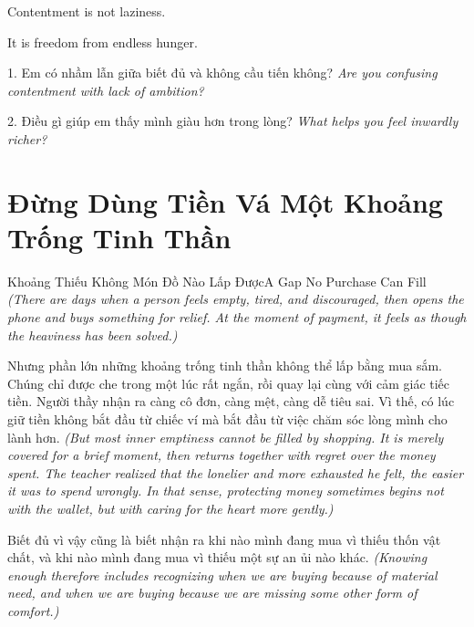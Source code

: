 \begin{ghinhoanh}
Contentment is not laziness.

It is freedom from endless hunger.
\end{ghinhoanh}

\begin{tuhocnhanh}
1. Em có nhầm lẫn giữa biết đủ và không cầu tiến không? \textit{Are you confusing contentment with lack of ambition?}

2. Điều gì giúp em thấy mình giàu hơn trong lòng? \textit{What helps you feel inwardly richer?}
\end{tuhocnhanh}
\ngancach

\section{Đừng Dùng Tiền Vá Một Khoảng Trống Tinh Thần}
\begin{truyen}{Khoảng Thiếu Không Món Đồ Nào Lấp Được}{A Gap No Purchase Can Fill}
\textit{(There are days when a person feels empty, tired, and discouraged, then opens the phone and buys something for relief. At the moment of payment, it feels as though the heaviness has been solved.)}

Nhưng phần lớn những khoảng trống tinh thần không thể lấp bằng mua sắm. Chúng chỉ được che trong một lúc rất ngắn, rồi quay lại cùng với cảm giác tiếc tiền. Người thầy nhận ra càng cô đơn, càng mệt, càng dễ tiêu sai. Vì thế, có lúc giữ tiền không bắt đầu từ chiếc ví mà bắt đầu từ việc chăm sóc lòng mình cho lành hơn.
\textit{(But most inner emptiness cannot be filled by shopping. It is merely covered for a brief moment, then returns together with regret over the money spent. The teacher realized that the lonelier and more exhausted he felt, the easier it was to spend wrongly. In that sense, protecting money sometimes begins not with the wallet, but with caring for the heart more gently.)}

Biết đủ vì vậy cũng là biết nhận ra khi nào mình đang mua vì thiếu thốn vật chất, và khi nào mình đang mua vì thiếu một sự an ủi nào khác.
\textit{(Knowing enough therefore includes recognizing when we are buying because of material need, and when we are buying because we are missing some other form of comfort.)}
\end{truyen}

